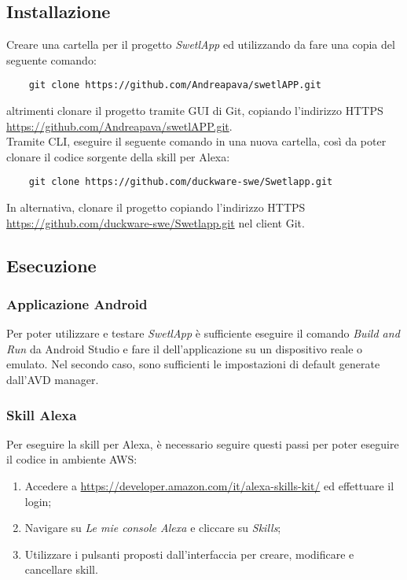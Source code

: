 \subsection{Installazione}
Creare una cartella per il progetto \textit{SwetlApp} ed utilizzando  da  fare una copia del seguente comando:
\begin{verbatim}
    git clone https://github.com/Andreapava/swetlAPP.git
\end{verbatim}
altrimenti clonare il progetto tramite  GUI di Git, copiando l'indirizzo HTTPS \href{https://github.com/Andreapava/swetlAPP.git}{https://github.com/Andreapava/swetlAPP.git}.\\
Tramite CLI, eseguire il seguente comando in una nuova cartella, così da poter clonare il codice sorgente della skill per Alexa:
\begin{verbatim}
    git clone https://github.com/duckware-swe/Swetlapp.git
\end{verbatim}
In alternativa, clonare il progetto copiando l'indirizzo HTTPS \href{https://github.com/duckware-swe/Swetlapp.git}{https://github.com/duckware-swe/Swetlapp.git} nel client Git.

\subsection{Esecuzione}
\subsubsection{Applicazione Android}
Per poter utilizzare e testare \textit{SwetlApp} è sufficiente eseguire il comando \emph{Build and Run} da Android Studio e fare il  dell'applicazione su un dispositivo reale o emulato. Nel secondo caso, sono sufficienti le impostazioni di default generate dall'AVD manager.
\subsubsection{Skill Alexa}
Per eseguire la skill per Alexa, è necessario seguire questi passi per poter eseguire il codice in ambiente AWS:
\begin{enumerate}
    \item Accedere a \url{https://developer.amazon.com/it/alexa-skills-kit/} ed effettuare il login;
    \item Navigare su \emph{Le mie console Alexa} e cliccare su \emph{Skills};
    \item Utilizzare i pulsanti proposti dall'interfaccia per creare, modificare e cancellare skill.
\end{enumerate}